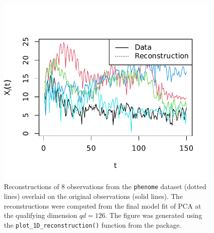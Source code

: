 \begin{figure}
    \centering
    \includegraphics[width=0.75\linewidth]{figures/phoneme-reconstruction.pdf}
    \caption{Reconstructions of $8$ observations from the \texttt{phenome} dataset (dotted lines) overlaid on the original observations (solid lines). The reconstructions were computed from the final model fit of PCA at the qualifying dimension $qd=126$. The figure was generated using the \texttt{plot\_1D\_reconstruction()} function from the  package.}
    \label{fig:phoneme-reconstruction}
\end{figure}